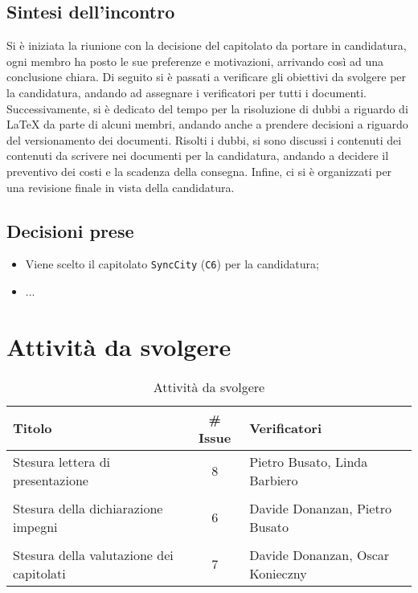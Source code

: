 \subsection{Sintesi dell'incontro}
Si è iniziata la riunione con la decisione del capitolato da portare in candidatura, ogni membro ha posto le sue preferenze e motivazioni, arrivando così ad una conclusione chiara. Di seguito si è passati a verificare gli obiettivi da svolgere per la candidatura, andando ad assegnare i verificatori per tutti i documenti. Successivamente, si è dedicato del tempo per la risoluzione di dubbi a riguardo di \LaTeX\: da parte di alcuni membri, andando anche a prendere decisioni a riguardo del versionamento dei documenti. Risolti i dubbi, si sono discussi i contenuti dei contenuti da scrivere nei documenti per la candidatura, andando a decidere il preventivo dei costi e la scadenza della consegna. Infine, ci si è organizzati per una revisione finale in vista della candidatura.
\subsection{Decisioni prese}
\begin{itemize}
	\setlength\itemsep{0em}
	\item Viene scelto il capitolato \texttt{SyncCity} (\texttt{C6}) per la candidatura;
	\item ...
\end{itemize}
\section{Attività da svolgere}
\begin{table}[ht!]
	\centering
	\begin{tabular}{lcl}
		\toprule
		\textbf{Titolo} & \textbf{\# Issue} & \textbf{Verificatori} \\
		\midrule
		Stesura lettera di presentazione & 8 & Pietro Busato, Linda Barbiero\\\\
		Stesura della dichiarazione impegni  &  6 & Davide Donanzan, Pietro Busato \\\\
		Stesura della valutazione dei capitolati & 7 & Davide Donanzan, Oscar Konieczny \\
		\bottomrule
	\end{tabular}
	\caption{Attività da svolgere}
	\label{table:Attivita da svolgere}
\end{table}


